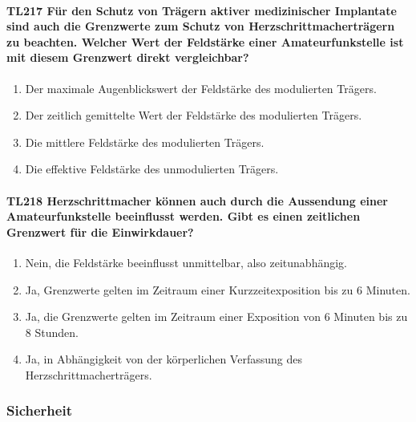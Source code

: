 \documentclass[8pt]{article}
\begin{document}
\paragraph*{TL217 Für den Schutz von Trägern aktiver medizinischer Implantate sind auch die Grenzwerte zum Schutz von Herzschrittmacherträgern zu beachten. Welcher Wert der Feldstärke einer Amateurfunkstelle ist mit diesem Grenzwert direkt vergleichbar?} 
\begin{enumerate}[nolistsep,label=\Alph*]
\item Der maximale Augenblickswert der Feldstärke des modulierten Trägers. 
\item Der zeitlich gemittelte Wert der Feldstärke des modulierten Trägers.
\item Die mittlere Feldstärke des modulierten Trägers. 
\item Die effektive Feldstärke des unmodulierten Trägers.
\end{enumerate}

\paragraph*{TL218 Herzschrittmacher können auch durch die Aussendung einer Amateurfunkstelle beeinflusst werden. Gibt es einen zeitlichen Grenzwert für die Einwirkdauer?}
\begin{enumerate}[nolistsep,label=\Alph*]
\item Nein, die Feldstärke beeinflusst unmittelbar, also zeitunabhängig. 
\item Ja, Grenzwerte gelten im Zeitraum einer Kurzzeitexposition bis zu 6 Minuten.
\item Ja, die Grenzwerte gelten im Zeitraum einer Exposition von 6 Minuten bis zu 8 Stunden.
\item Ja, in Abhängigkeit von der körperlichen Verfassung des Herzschrittmacherträgers.
\end{enumerate}

\pagebreak
\subsubsection{Sicherheit}
\end{document}
